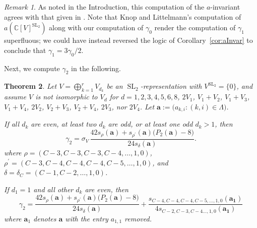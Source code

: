 \documentclass{amsart}
\newtheorem{theorem}{Theorem}[section]
\theoremstyle{definition}
\theoremstyle{remark}
\newtheorem{remark}[theorem]{Remark}
\newcommand{\C}{\mathbb{C}}
\newcommand{\SL}{\operatorname{SL}}
\newcommand{\bs}{\boldsymbol}
\begin{document}
\begin{remark}
\label{rem:KnopLittelmanGam1Superfluous}
As noted in the Introduction, this computation of the $a$-invariant agrees with that given
in \cite[Satz 1]{KnopLittelmann}. Note that Knop and Littelmann's computation of $a(\C[V]^{\SL_2})$ along with our computation of $\gamma_0$ render the computation
of $\gamma_1$ superfluous; we could have instead reversed the logic of
Corollary~\ref{cor:aInvar} to conclude that $\gamma_1 = 3\gamma_0/2$.
\end{remark}

Next, we compute $\gamma_2$ in the following.

\begin{theorem}
\label{thrm:Gamma2Schur}
Let $V = \bigoplus_{k=1}^r V_{d_k}$ be an $\SL_2$-representation with $V^{\SL_2} = \{0\}$,
and assume $V$ is not isomorphic to $V_d$ for $d=1,2,3,4,5,6,8$, $2V_1$, $V_1+V_2$, $V_1+V_3$, $V_1+V_4$,
$2V_2$, $V_2+V_3$, $V_2+V_4$, $2V_3$, nor $2V_4$.
Let $\bs{a} := \big(a_{k,i} : (k,i)\in\Lambda\big)$.

If all $d_k$ are even, at least two $d_k$ are odd, or at least one odd $d_k > 1$, then
\begin{equation}
\label{eq:Gamma2SchurCase1}
    \gamma_2
    =
    \sigma_V\,
    \frac{42 s_{\rho}(\bs{a}) + s_{\rho^\prime}(\bs{a})
            \big( P_2(\bs{a})  - 8\big) }
                {24 s_\delta(\bs{a})}.
\end{equation}
where $\rho = (C-3,C-3,C-3,C-4,\ldots,1,0)$, $\rho^\prime = (C-3, C-4, C-4, C-4, C-5,\ldots,1,0)$,
and $\delta = \delta_C= (C-1,C-2,\ldots,1,0)$.

If $d_1 = 1$ and all other $d_k$ are even, then
\begin{equation}
\label{eq:Gamma2SchurCase2}
    \gamma_2
    =
    \frac{42 s_{\rho}(\bs{a}) + s_{\rho^\prime}(\bs{a})
            \big( P_2(\bs{a})  - 8\big) }
                {24 s_\delta(\bs{a})}
        + \frac{s_{C - 4, C - 4, C - 4, C - 5, \ldots, 1, 0}(\bs{a_1}) }
            {4 s_{C - 2, C - 3, C - 4 \ldots, 1, 0}(\bs{a_1}) }
\end{equation}
where $\bs{a}_1$ denotes $\bs{a}$ with the entry $a_{1,1}$ removed.
\end{theorem}
\end{document}
